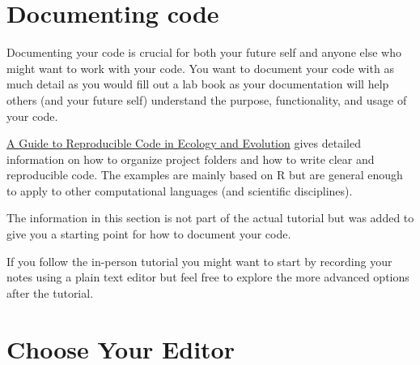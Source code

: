 \documentclass[
  letterpaper,
  DIV=11,
  numbers=noendperiod]{scrreprt}
\author{}
\date{}
\renewcommand*\contentsname{Table of contents}
\newcommand\contentsname{Table of contents}
\begin{document}

\renewcommand*\contentsname{Table of contents}
{
\hypersetup{linkcolor=}
\setcounter{tocdepth}{1}
\tableofcontents
}

\section{Documenting code}\label{documenting-code}

Documenting your code is crucial for both your future self and anyone
else who might want to work with your code. You want to document your
code with as much detail as you would fill out a lab book as your
documentation will help others (and your future self) understand the
purpose, functionality, and usage of your code.

\href{https://www.britishecologicalsociety.org/wp-content/uploads/2017/12/guide-to-reproducible-code.pdf}{A
Guide to Reproducible Code in Ecology and Evolution} gives detailed
information on how to organize project folders and how to write clear
and reproducible code. The examples are mainly based on R but are
general enough to apply to other computational languages (and scientific
disciplines).

\begin{tcolorbox}[enhanced jigsaw, titlerule=0mm, leftrule=.75mm, title=\textcolor{quarto-callout-note-color}{\faInfo}\hspace{0.5em}{Note}, rightrule=.15mm, breakable, colframe=quarto-callout-note-color-frame, colback=white, colbacktitle=quarto-callout-note-color!10!white, opacityback=0, toprule=.15mm, opacitybacktitle=0.6, toptitle=1mm, bottomtitle=1mm, arc=.35mm, left=2mm, bottomrule=.15mm, coltitle=black]

The information in this section is not part of the actual tutorial but
was added to give you a starting point for how to document your code.

If you follow the in-person tutorial you might want to start by
recording your notes using a plain text editor but feel free to explore
the more advanced options after the tutorial.

\end{tcolorbox}

\section{Choose Your Editor}\label{choose-your-editor}
\end{document}
